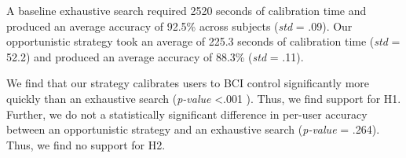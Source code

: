 A baseline exhaustive search required 2520 seconds of calibration time and produced an average accuracy of 92.5\% across subjects (\textit{std} = .09). Our opportunistic strategy took an average of 225.3 seconds of calibration time (\textit{std} = 52.2) and produced an average accuracy of 88.3\% (\textit{std} = .11).

We find that our strategy calibrates users to BCI control significantly more quickly than an exhaustive search (\textit{p-value} \textless .001 ). Thus, we find support for H1. Further, we do not a statistically significant difference in per-user accuracy between an opportunistic strategy and an exhaustive search (\textit{p-value} = .264). Thus, we find no support for H2.

